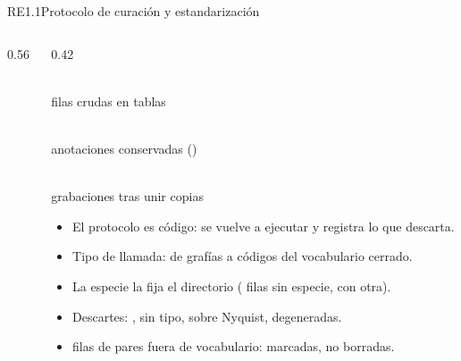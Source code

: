 \documentclass[aspectratio=169, 9pt]{beamer}
\newcommand{\valores}[1]{}
\newcommand{\cifra}[2]{\begin{minipage}[t]{0.31\textwidth}\centering{\Large\bfseries\color{azul}#1}\\[1pt]{\scriptsize\color{gris}#2}\end{minipage}}
\begin{document}
\begin{frame}{RE1.1}{Protocolo de curación y estandarización}
    \valores{RE_1-1}
    \begin{columns}[T]
        \begin{column}{0.56\textwidth}
            \centering
            \resizebox{!}{0.78\textheight}{}
        \end{column}
        \begin{column}{0.42\textwidth}
            \vspace{2ex}
            \cifra{\nRawRows}{filas crudas en \nPaired{} tablas}\hfill
            \cifra{\nKept}{anotaciones conservadas (\pctKept)}\hfill
            \cifra{\nUniqueRecordings}{grabaciones tras unir \nCopies{} copias}
            \vspace{3ex}
            \begin{itemize}
                \item El protocolo es código: se vuelve a ejecutar y registra lo que descarta.
                \item Tipo de llamada: de \nRawCallValues{} grafías a \nVocabCallValues{}
                      códigos del vocabulario cerrado.
                \item La especie la fija el directorio (\nSpeciesEmpty{} filas sin especie,
                      \nSpeciesMismatch{} con otra).
                \item Descartes: \nNoise{} , \nEmptyCall{} sin tipo, \nNyquist{}
                      sobre Nyquist, \nDegenerate{} degeneradas.
                \item \nReview{} filas de \nReviewPairs{} pares fuera de vocabulario: marcadas,
                      no borradas.
            \end{itemize}
        \end{column}
    \end{columns}
\end{frame}
\end{document}
